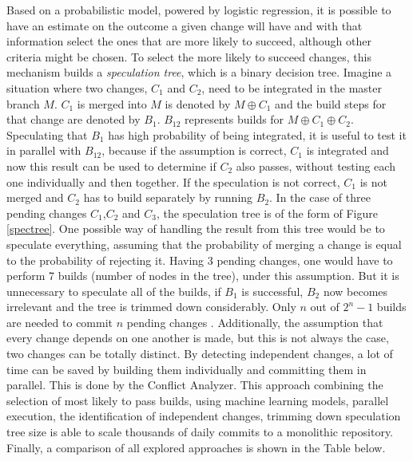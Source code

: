 Based on a probabilistic model, powered by logistic regression, it is possible to have an estimate on the outcome a given change will have and with that information select the ones that are more likely to succeed, although other criteria might be chosen. To select the more likely to succeed changes, this mechanism builds a \textit{speculation tree}, which is a binary decision tree. Imagine a situation where two changes, $C_1$ and $C_2$, need to be integrated in the master branch $M$. $C_1$ is merged into $M$ is denoted by $M \oplus C_1$ and the build steps for that change are denoted by $B_1$. $B_{12}$ represents builds for $M \oplus C_1 \oplus C_2 $.  Speculating that $B_1$ has high probability of being integrated, it is useful to test it in parallel with $B_{12}$, because if the assumption is correct, $C_1$ is integrated and now this result can be used to determine if $C_2$ also passes, without testing each one individually and then together. If the speculation is not correct, $C_1$ is not merged and $C_2$ has to build separately by running $B_2$. In the case of three pending changes $C_1$,$C_2$ and $C_3$, the speculation tree is of the form of Figure \ref{spectree}. One possible way of handling the result from this tree would be to speculate everything, assuming that the probability of merging a change is equal to the probability of rejecting it. Having 3 pending changes, one would have to perform 7 builds (number of nodes in the tree), under this assumption. But it is unnecessary to speculate all of the builds, if $B_1$ is successful, $B_2$ now becomes irrelevant and the tree is trimmed down considerably. Only $n$ out of $2^n - 1$ builds are needed to commit $n$ pending changes \cite{Uber}. Additionally, the assumption that every change depends on one another is made, but this is not always the case, two changes can be totally distinct. By detecting independent changes,  a lot of time can be saved by building them individually and committing them in parallel. This is done by the Conflict Analyzer. This approach combining the selection of most likely to pass builds, using machine learning models, parallel execution, the identification of independent changes, trimming down speculation tree size is able to scale thousands of daily commits to a monolithic repository. Finally, a comparison of all explored approaches is shown in the Table below.


